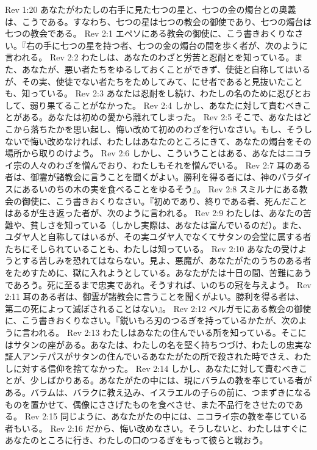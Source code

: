 Rev 1:20  あなたがわたしの右手に見た七つの星と、七つの金の燭台との奥義は、こうである。すなわち、七つの星は七つの教会の御使であり、七つの燭台は七つの教会である。
Rev 2:1  エペソにある教会の御使に、こう書きおくりなさい。『右の手に七つの星を持つ者、七つの金の燭台の間を歩く者が、次のように言われる。
Rev 2:2  わたしは、あなたのわざと労苦と忍耐とを知っている。また、あなたが、悪い者たちをゆるしておくことができず、使徒と自称してはいるが、その実、使徒でない者たちをためしてみて、にせ者であると見抜いたことも、知っている。
Rev 2:3  あなたは忍耐をし続け、わたしの名のために忍びとおして、弱り果てることがなかった。
Rev 2:4  しかし、あなたに対して責むべきことがある。あなたは初めの愛から離れてしまった。
Rev 2:5  そこで、あなたはどこから落ちたかを思い起し、悔い改めて初めのわざを行いなさい。もし、そうしないで悔い改めなければ、わたしはあなたのところにきて、あなたの燭台をその場所から取りのけよう。
Rev 2:6  しかし、こういうことはある、あなたはニコライ宗の人々のわざを憎んでおり、わたしもそれを憎んでいる。
Rev 2:7  耳のある者は、御霊が諸教会に言うことを聞くがよい。勝利を得る者には、神のパラダイスにあるいのちの木の実を食べることをゆるそう』。
Rev 2:8  スミルナにある教会の御使に、こう書きおくりなさい。『初めであり、終りである者、死んだことはあるが生き返った者が、次のように言われる。
Rev 2:9  わたしは、あなたの苦難や、貧しさを知っている（しかし実際は、あなたは富んでいるのだ）。また、ユダヤ人と自称してはいるが、その実ユダヤ人でなくてサタンの会堂に属する者たちにそしられていることも、わたしは知っている。
Rev 2:10  あなたの受けようとする苦しみを恐れてはならない。見よ、悪魔が、あなたがたのうちのある者をためすために、獄に入れようとしている。あなたがたは十日の間、苦難にあうであろう。死に至るまで忠実であれ。そうすれば、いのちの冠を与えよう。
Rev 2:11  耳のある者は、御霊が諸教会に言うことを聞くがよい。勝利を得る者は、第二の死によって滅ぼされることはない』。
Rev 2:12  ペルガモにある教会の御使に、こう書きおくりなさい。『鋭いもろ刃のつるぎを持っているかたが、次のように言われる。
Rev 2:13  わたしはあなたの住んでいる所を知っている。そこにはサタンの座がある。あなたは、わたしの名を堅く持ちつづけ、わたしの忠実な証人アンテパスがサタンの住んでいるあなたがたの所で殺された時でさえ、わたしに対する信仰を捨てなかった。
Rev 2:14  しかし、あなたに対して責むべきことが、少しばかりある。あなたがたの中には、現にバラムの教を奉じている者がある。バラムは、バラクに教え込み、イスラエルの子らの前に、つまずきになるものを置かせて、偶像にささげたものを食べさせ、また不品行をさせたのである。
Rev 2:15  同じように、あなたがたの中には、ニコライ宗の教を奉じている者もいる。
Rev 2:16  だから、悔い改めなさい。そうしないと、わたしはすぐにあなたのところに行き、わたしの口のつるぎをもって彼らと戦おう。
